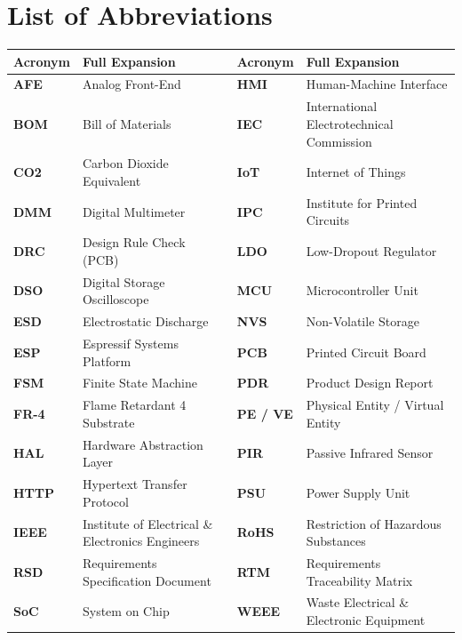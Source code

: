 \documentclass[11pt,a4paper]{article}
\begin{document}
\section*{List of Abbreviations}
\begin{table}[h!]
\centering
\begin{tabular}{llll}
\toprule
\textbf{Acronym} & \textbf{Full Expansion} & \textbf{Acronym} & \textbf{Full Expansion} \\
\midrule
\textbf{AFE} & Analog Front-End & \textbf{HMI} & Human-Machine Interface \\
\textbf{BOM} & Bill of Materials & \textbf{IEC} & International Electrotechnical Commission \\
\textbf{CO2} & Carbon Dioxide Equivalent & \textbf{IoT} & Internet of Things \\
\textbf{DMM} & Digital Multimeter & \textbf{IPC} & Institute for Printed Circuits \\
\textbf{DRC} & Design Rule Check (PCB) & \textbf{LDO} & Low-Dropout Regulator \\
\textbf{DSO} & Digital Storage Oscilloscope & \textbf{MCU} & Microcontroller Unit \\
\textbf{ESD} & Electrostatic Discharge & \textbf{NVS} & Non-Volatile Storage \\
\textbf{ESP} & Espressif Systems Platform & \textbf{PCB} & Printed Circuit Board \\
\textbf{FSM} & Finite State Machine & \textbf{PDR} & Product Design Report \\
\textbf{FR-4} & Flame Retardant 4 Substrate & \textbf{PE / VE} & Physical Entity / Virtual Entity \\
\textbf{HAL} & Hardware Abstraction Layer & \textbf{PIR} & Passive Infrared Sensor \\
\textbf{HTTP} & Hypertext Transfer Protocol & \textbf{PSU} & Power Supply Unit \\
\textbf{IEEE} & Institute of Electrical \& Electronics Engineers & \textbf{RoHS} & Restriction of Hazardous Substances \\
\textbf{RSD} & Requirements Specification Document & \textbf{RTM} & Requirements Traceability Matrix \\
\textbf{SoC} & System on Chip & \textbf{WEEE} & Waste Electrical \& Electronic Equipment \\
\bottomrule
\end{tabular}
\end{table}

\newpage
\end{document}
